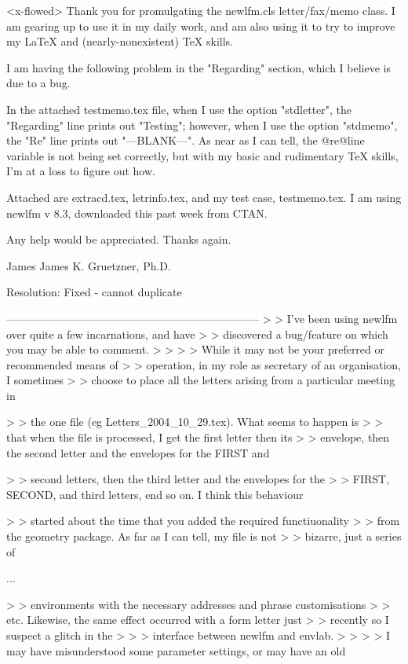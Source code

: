 <x-flowed>
Thank you for promulgating the newlfm.cls letter/fax/memo class.  I am 
gearing up to use it in my daily work, and am also using it to try to 
improve my LaTeX and (nearly-nonexistent) TeX skills. 

I am having the following problem in the "Regarding" section, which I 
believe is due to a bug.

In the attached testmemo.tex file, when I use the option "stdletter", 
the "Regarding" line prints out "Testing"; however, when I use the 
option "stdmemo", the "Re" line prints out "---BLANK---".      As near 
as I can tell, the  @re@line   variable is not being set correctly, but 
with my basic and rudimentary TeX skills, I'm at a loss to figure out how.

Attached are extracd.tex, letrinfo.tex, and my test case, 
testmemo.tex.   I am using newlfm v 8.3, downloaded this past week from 
CTAN. 

Any help would be appreciated.  Thanks again.


   James
James K. Gruetzner, Ph.D.

Resolution: Fixed - cannot duplicate

---------------------------------------------------------------------
> > I've been using newlfm over quite a few incarnations, and have 
> > discovered a bug/feature on which you may be able to comment.
> >
> > While it may not be your preferred or recommended means of 
> > operation, in my role as secretary of an organisation, I sometimes 
> > choose to place all the letters arising from a particular meeting in


> > the one file (eg Letters_2004_10_29.tex).  What seems to happen is 
> > that when the file is processed, I get the first letter then its 
> > envelope, then the second letter and the envelopes for the FIRST and


> > second letters, then the third letter and the envelopes for the 
> > FIRST, SECOND, and third letters, end so on.  I think this behaviour


> > started about the time that you added the required functiuonality 
> > from the geometry package.  As far as I can tell, my file is not 
> > bizarre, just a series of \begin{newlfm} ... \end{newlfm} 
> > environments with the necessary addresses and phrase customisations 
> > etc.  Likewise, the same effect occurred with a form letter just 
> > recently so I suspect a glitch in the
>
> > interface between newlfm and envlab.
> >
> > I may have misunderstood some parameter settings, or may have an old

